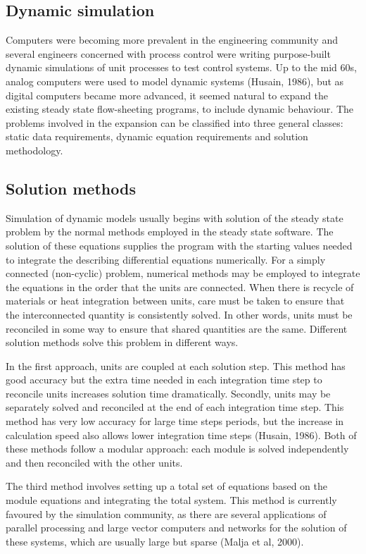 \subsection{Dynamic simulation}
Computers were becoming more prevalent in the engineering community
and several engineers concerned with process control were writing
purpose-built dynamic simulations of unit processes to test control
systems.  Up to the mid 60s, analog computers were used to model
dynamic systems (Husain, 1986), but as digital computers became more
advanced, it seemed natural to expand the existing steady state
flow-sheeting programs, to include dynamic behaviour. The problems
involved in the expansion can be classified into three general
classes: static data requirements, dynamic equation requirements and
solution methodology.

\subsection{Solution methods}
Simulation of dynamic models usually begins with solution of the steady
state problem by the normal methods employed in the steady state
software.  The solution of these equations supplies the program with
the starting values needed to integrate the describing differential
equations numerically.  For a simply connected (non-cyclic) problem,
numerical methods may be employed to integrate the equations in the
order that the units are connected.  When there is recycle of
materials or heat integration between units, care must be taken to
ensure that the interconnected quantity is consistently solved.  In
other words, units must be reconciled in some way to ensure that
shared quantities are the same.  Different solution methods solve this
problem in different ways.

In the first approach, units are coupled at each solution step.  This
method has good accuracy but the extra time needed in each integration
time step to reconcile units increases solution time dramatically.
Secondly, units may be separately solved and reconciled at the end of
each integration time step.  This method has very low accuracy for
large time steps periods, but the increase in calculation speed also
allows lower integration time steps (Husain, 1986).  Both of these
methods follow a modular approach: each module is solved independently
and then reconciled with the other units.

The third method involves setting up a total set of equations based on
the module equations and integrating the total system.  This method is
currently favoured by the simulation community, as there are several
applications of parallel processing and large vector computers and
networks for the solution of these systems, which are usually large
but sparse (Malja et al, 2000).

